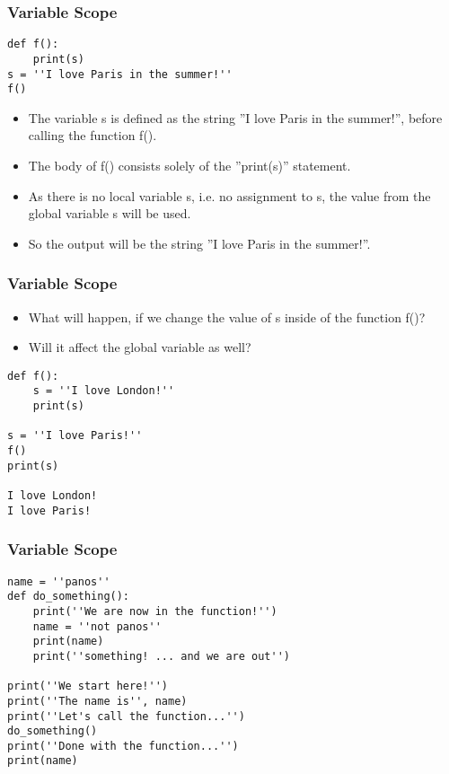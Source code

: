 \begin{frame}[fragile]\frametitle{Variable Scope}
\begin{lstlisting}
def f(): 
    print(s) 
s = ''I love Paris in the summer!''
f()
\end{lstlisting}

    \begin{itemize}
    \item The variable s is defined as the string ''I love Paris in the summer!'', before calling the function f(). 
    \item The body of f() consists solely of the ''print(s)'' statement. 
    \item As there is no local variable s, i.e. no assignment to s, the value from the global variable s will be used. 
    \item So the output will be the string ''I love Paris in the summer!''.
    \end{itemize}
\end{frame}

\begin{frame}[fragile]\frametitle{Variable Scope}

    \begin{itemize}
    \item What will happen, if we change the value of s inside of the function f()?
    \item  Will it affect the global variable as well?
    \end{itemize}
\begin{lstlisting}
def f(): 
    s = ''I love London!''
    print(s) 

s = ''I love Paris!'' 
f()
print(s)

I love London!
I love Paris!
\end{lstlisting}

\end{frame}

\begin{frame}[fragile]\frametitle{Variable Scope}
\begin{lstlisting}
name = ''panos''
def do_something():
    print(''We are now in the function!'')
    name = ''not panos''
    print(name)
    print(''something! ... and we are out'')
    
print(''We start here!'')
print(''The name is'', name)
print(''Let's call the function...'')
do_something()
print(''Done with the function...'')
print(name)
\end{lstlisting}
\end{frame}

